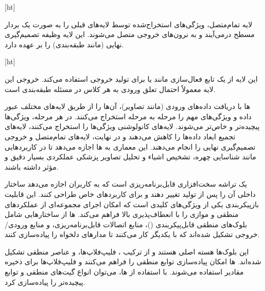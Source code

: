 [ht]



لایه تمام‌متصل، ویژگی‌های استخراج‌شده توسط لایه‌های قبلی را به صورت یک بردار مسطح درمی‌آیند و به نرون‌های خروجی متصل می‌شوند. این لایه وظیفه تصمیم‌گیری نهایی (مانند طبقه‌بندی) را بر عهده دارد.

[ht]


این لایه از یک تابع فعال‌سازی مانند  یا  برای تولید خروجی استفاده می‌کند. خروجی این لایه معمولاً احتمال تعلق ورودی به هر کلاس در مسئله طبقه‌بندی است.





ها
با دریافت داده‌های ورودی (مانند تصاویر)، آن‌ها را از طریق لایه‌های مختلف عبور داده و ویژگی‌های مهم را مرحله به مرحله استخراج می‌کنند. در هر مرحله، ویژگی‌ها پیچیده‌تر و خاص‌تر می‌شوند. لایه‌های کانولوشنی ویژگی‌ها را استخراج می‌کنند، لایه‌های تجمیع ابعاد داده‌ها را کاهش می‌دهند و در نهایت، لایه‌های تمام‌متصل و خروجی تصمیم‌گیری نهایی را انجام می‌دهند. این معماری به ‌ها اجازه می‌دهد تا در کاربردهایی مانند شناسایی چهره، تشخیص اشیاء و تحلیل تصاویر پزشکی عملکردی بسیار دقیق و مؤثر داشته باشند.





یک تراشه سخت‌افزاری قابل‌برنامه‌ریزی است که به کاربران اجازه می‌دهد ساختار داخلی آن را پس از تولید تغییر دهند و برای کاربردهای خاص طراحی کنند. این قابلیت بازپیکربندی یکی از ویژگی‌های کلیدی  است که امکان اجرای مجموعه‌ای از عملکردهای منطقی و موازی را با انعطاف‌پذیری بالا فراهم می‌کند. ‌ها از ساختارهایی شامل بلوک‌های منطقی قابل‌پیکربندی ()، منابع اتصالات قابل‌برنامه‌ریزی، و منابع ورودی/خروجی تشکیل شده‌اند که با یکدیگر کار می‌کنند تا مدارهای دلخواه را پیاده‌سازی کنند.




این بلوک‌ها هسته اصلی  هستند و از ترکیب ، فلیپ‌فلاپ‌ها، و عناصر منطقی تشکیل شده‌اند. ها امکان پیاده‌سازی توابع منطقی را فراهم می‌کنند و فلیپ‌فلاپ‌ها برای ذخیره مقادیر استفاده می‌شوند. با استفاده از ها، می‌توان انواع گیت‌های منطقی و توابع پیچیده‌تر را پیاده‌سازی کرد.

